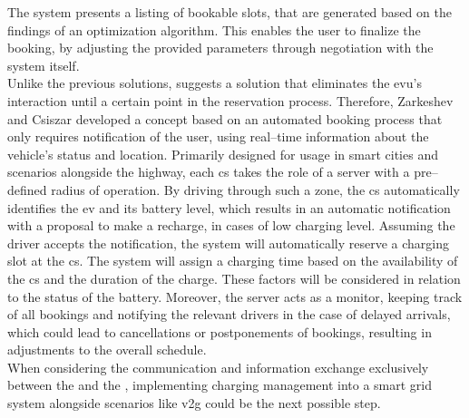 The system presents a listing of bookable slots, that are generated based on the findings of an optimization algorithm. This enables the user to finalize the booking, by adjusting the provided parameters through negotiation with the system itself. \\
\noindent Unlike the previous solutions, \cite{zarkeshev_charging_2018} suggests a solution that eliminates the \acrshort{evu}'s interaction until a certain point in the reservation process.
Therefore, Zarkeshev and Csiszar developed a concept based on an automated booking process that only requires notification of the user, using real--time information about the vehicle's status and location.
Primarily designed for usage in smart cities and scenarios alongside the highway, each \acrshort{cs} takes the role of a server with a pre--defined radius of operation. By driving through such a zone, the \acrshort{cs} automatically identifies the \acrshort{ev} and its battery level, which results in an automatic notification with a proposal to make a recharge, in cases of low charging level. 
Assuming the driver accepts the notification, the system will automatically reserve a charging slot at the \acrshort{cs}. The system will assign a charging time based on the availability of the \acrshort{cs} and the duration of the charge. These factors will be considered in relation to the status of the battery.
Moreover, the server acts as a monitor, keeping track of all bookings and notifying the relevant drivers in the case of delayed arrivals, which could lead to cancellations or postponements of bookings, resulting in adjustments to the overall schedule. \\
\noindent When considering the communication and information exchange exclusively between the  and the , implementing charging management into a smart grid system alongside scenarios like \acrshort{v2g} could be the next possible step. 
